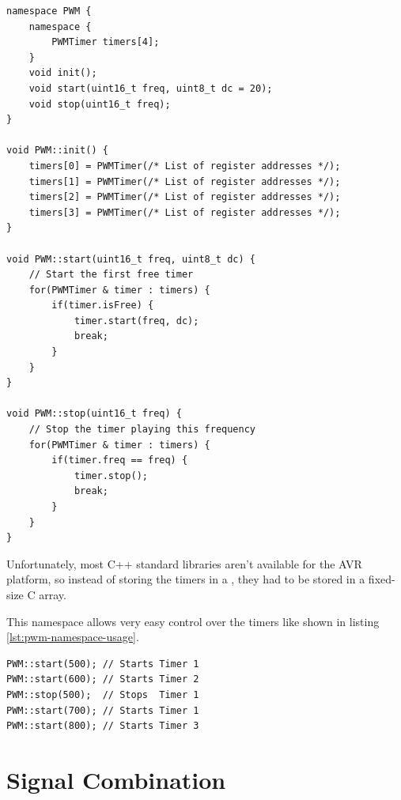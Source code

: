 \begin{lstlisting}[caption=PWM namespace, label=lst:pwm-namespace]
namespace PWM {
	namespace {
		PWMTimer timers[4];
	}
	void init();
	void start(uint16_t freq, uint8_t dc = 20);
	void stop(uint16_t freq);
}

void PWM::init() {
    timers[0] = PWMTimer(/* List of register addresses */);
	timers[1] = PWMTimer(/* List of register addresses */);
	timers[2] = PWMTimer(/* List of register addresses */);
	timers[3] = PWMTimer(/* List of register addresses */);
}

void PWM::start(uint16_t freq, uint8_t dc) {
    // Start the first free timer
    for(PWMTimer & timer : timers) {
        if(timer.isFree) {
            timer.start(freq, dc);
            break;
        }
    }
}

void PWM::stop(uint16_t freq) {
    // Stop the timer playing this frequency
    for(PWMTimer & timer : timers) {
        if(timer.freq == freq) {
            timer.stop();
            break;
        }
    }
}
\end{lstlisting}

Unfortunately, most C++ standard libraries aren't available for the AVR platform, so instead of storing the timers in a , they had to be stored in a fixed-size C array.

This namespace allows very easy control over the timers like shown in listing \ref{lst:pwm-namespace-usage}.

\begin{lstlisting}[caption=PWM namespace usage, label=lst:pwm-namespace-usage]
PWM::start(500); // Starts Timer 1
PWM::start(600); // Starts Timer 2
PWM::stop(500);  // Stops  Timer 1
PWM::start(700); // Starts Timer 1
PWM::start(800); // Starts Timer 3
\end{lstlisting}

\section{Signal Combination}
\label{sec:signal-combination}